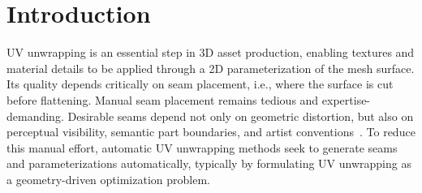 \section{Introduction}
UV unwrapping is an essential step in 3D asset production, enabling textures and material details to be applied through a 2D parameterization of the mesh surface. Its quality depends critically on seam placement, i.e., where the surface is cut before flattening.  
Manual seam placement remains tedious and expertise-demanding. Desirable seams depend not only on geometric distortion, but also on perceptual visibility, semantic part boundaries, and artist conventions~\cite{DBLP:conf/visualization/ShefferH02,DBLP:conf/siggrapha/LucquinDB17,wang2025partuv}. To reduce this manual effort, 
automatic UV unwrapping methods seek to generate seams and parameterizations automatically, typically by formulating UV unwrapping as a geometry-driven optimization problem.

 
